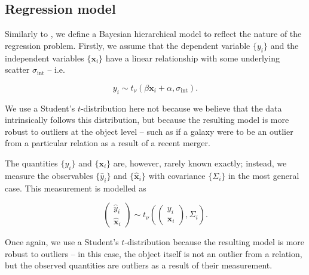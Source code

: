 \documentclass[fleqn,usenatbib]{mnras}
\newcommand{\studentt}[2]{t_\nu \left( #1, #2 \right)}
\newcommand{\depvar}{y_i}
\newcommand{\indepvars}{\boldsymbol{x}_i}
\newcommand{\obsdep}{\hat{y}_i}
\newcommand{\obsindep}{\hat{\boldsymbol{x}}_i}
\newcommand{\obserr}{\Sigma_i}
\newcommand{\intscttr}{\sigma_{\text{int}}}
\newcommand{\intercept}{\alpha}
\newcommand{\covariate}{\beta}
\begin{document}
\subsection{Regression model}
\label{sec:formalism.model}

Similarly to \citet{Kelly:2007}, we define a Bayesian hierarchical model to
reflect the nature of the regression problem. Firstly, we assume that the
dependent variable $\{\depvar\}$ and the independent variables $\{\indepvars\}$
have a linear relationship with some underlying scatter $\intscttr$ -- i.e.

\begin{equation}
\depvar \sim \studentt{\covariate \indepvars + \intercept}{\intscttr}.
\end{equation}

We use a Student's $t$-distribution here not because we believe that the data
intrinsically follows this distribution, but because the resulting model is more
robust to outliers at the object level -- such as if a galaxy were to be an
outlier from a particular relation as a result of a recent merger.

The quantities $\{\depvar\}$ and $\{\indepvars\}$ are, however, rarely known
exactly; instead, we measure the observables $\{\obsdep\}$ and $\{\obsindep\}$
with covariance $\{\obserr\}$ in the most general case. This measurement is
modelled as

\begin{equation}
    \begin{pmatrix}
        \obsdep \\ \obsindep
    \end{pmatrix}
    \sim
    \studentt{
        \begin{pmatrix}
            \depvar \\ \indepvars
        \end{pmatrix}
    }{
        \obserr
    }.
\end{equation}

Once again, we use a Student's $t$-distribution because the resulting model is
more robust to outliers -- in this case, the object itself is not an outlier
from a relation, but the observed quantities are outliers as a result of their
measurement.
\end{document}
